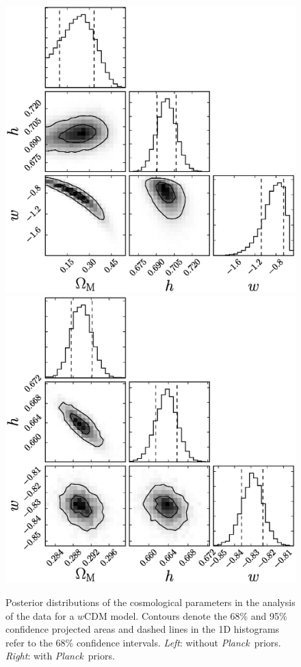 \documentclass[12pt,a4paper]{article}
\newcommand\Planck{{\it Planck}\ }
\begin{document}
%
\begin{figure}
  \includegraphics[width=0.5\linewidth]{figures/betoule_wcdm_noprior_corner.eps}
  \includegraphics[width=0.5\linewidth]{figures/betoule_wcdm_withprior_corner.eps}
  \caption{Posterior distributions of the cosmological parameters in the
    analysis of the \citet{betoule2014} data for a $w$CDM model. Contours denote the
    68\% and 95\% confidence projected areas and dashed lines in
    the 1D histograms refer to the 68\% confidence intervals. {\it Left}: without 
    \Planck priors. {\it Right}: with \Planck priors.}
  \label{fig:betoule_wcdm_corner}
\end{figure}
%
\end{document}

